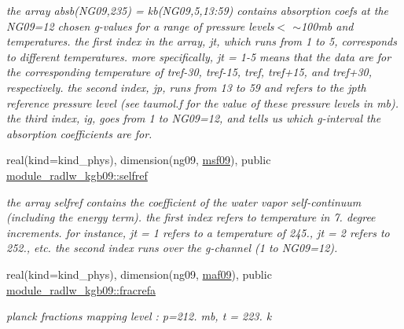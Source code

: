 \begin{DoxyCompactItemize}
\begin{DoxyCompactList}\small\item\em the array absb(\+N\+G09,235) = kb(\+N\+G09,5,13\+:59) contains absorption coefs at the N\+G09=12 chosen g-\/values for a range of pressure levels$<$ $\sim$100mb and temperatures. the first index in the array, jt, which runs from 1 to 5, corresponds to different temperatures. more specifically, jt = 1-\/5 means that the data are for the corresponding temperature of tref-\/30, tref-\/15, tref, tref+15, and tref+30, respectively. the second index, jp, runs from 13 to 59 and refers to the jpth reference pressure level (see taumol.\+f for the value of these pressure levels in mb). the third index, ig, goes from 1 to N\+G09=12, and tells us which g-\/interval the absorption coefficients are for. \end{DoxyCompactList}\item 
\mbox{\label{group__module__radlw__kgbnn_ga1c65e91a215060738292d0ca5a8f38a2}} 
real(kind=kind\+\_\+phys), dimension(ng09, \hyperlink{group__module__radlw__kgbnn_ga7d728ef04b3f26c6b20149084334be5a}{msf09}), public \hyperlink{group__module__radlw__kgbnn_ga1c65e91a215060738292d0ca5a8f38a2}{module\+\_\+radlw\+\_\+kgb09\+::selfref}
\begin{DoxyCompactList}\small\item\em the array selfref contains the coefficient of the water vapor self-\/continuum (including the energy term). the first index refers to temperature in 7. degree increments. for instance, jt = 1 refers to a temperature of 245., jt = 2 refers to 252., etc. the second index runs over the g-\/channel (1 to N\+G09=12). \end{DoxyCompactList}\item 
\mbox{\label{group__module__radlw__kgbnn_gace3d3e2731609f7ea50eb798bd212f3b}} 
real(kind=kind\+\_\+phys), dimension(ng09, \hyperlink{group__module__radlw__kgbnn_ga7d5d565c87af7ef07dc17930f9cb9e57}{maf09}), public \hyperlink{group__module__radlw__kgbnn_gace3d3e2731609f7ea50eb798bd212f3b}{module\+\_\+radlw\+\_\+kgb09\+::fracrefa}
\begin{DoxyCompactList}\small\item\em planck fractions mapping level \+: p=212. mb, t = 223. k \end{DoxyCompactList}\item 
\mbox{\label{group__module__radlw__kgbnn_ga26476f00fe13c1c81d3ae0cf8e43c90b}} 

\end{DoxyCompactItemize}
